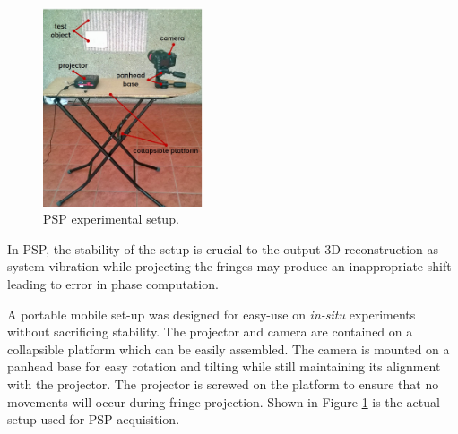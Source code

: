 \captionsetup[figure]{width=5in}
\begin{figure}[h!]
	\centering
	\includegraphics[width=0.42\textwidth]{figures/actualsetup.jpg}
	\caption[Actual PSP setup]{PSP experimental setup.}
	\label{fig:actual}
\end{figure}

In PSP, the stability of the setup is crucial to the output 3D reconstruction as system vibration while projecting the fringes may produce an inappropriate shift leading to error in phase computation. 

A portable mobile set-up was designed for easy-use on \textit{in-situ} experiments without sacrificing stability. The projector and camera are contained on a collapsible platform  which can be easily assembled. The camera is mounted on a panhead base for easy rotation and tilting while still maintaining its alignment with the projector. The projector is screwed on the platform to ensure that no movements will occur during fringe projection.
Shown in Figure \ref{fig:actual} is the actual setup used for PSP acquisition.
